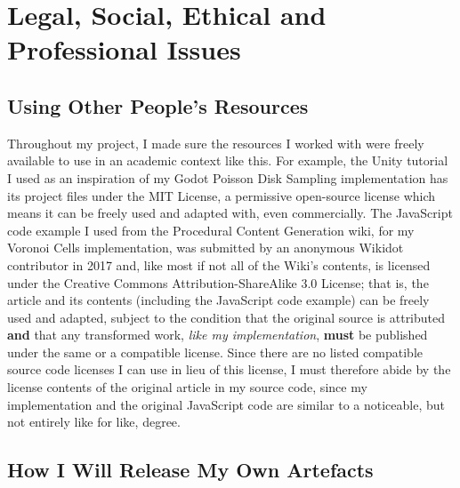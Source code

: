 \chapter{Legal, Social, Ethical and Professional Issues} \label{Issues}

\section{Using Other People's Resources}

Throughout my project, I made sure the resources I worked with were freely available to use in an academic context like this.
For example, the Unity tutorial I used as an inspiration of my Godot Poisson Disk Sampling implementation\cite{seblaguetuteYT} has its project files under the MIT License\cite{seblaguetuteGH}, a permissive open-source license which means it can be freely used and adapted with, even commercially.
The JavaScript code example I used from the Procedural Content Generation wiki, for my Voronoi Cells implementation, was submitted by an anonymous Wikidot contributor in 2017 and, like most if not all of the Wiki's contents, is licensed under the Creative Commons Attribution-ShareAlike 3.0 License; that is, the article and its contents (including the JavaScript code example) can be freely used and adapted, subject to the condition that the original source is attributed \textbf{and} that any transformed work, \textit{like my implementation}, \textbf{must} be published under the same or a compatible license. Since there are no listed compatible source code licenses I can use in lieu of this license, I must therefore abide by the license contents of the original article in my source code, since my implementation and the original JavaScript code are similar to a noticeable, but not entirely like for like, degree.

\section{How I Will Release My Own Artefacts}
